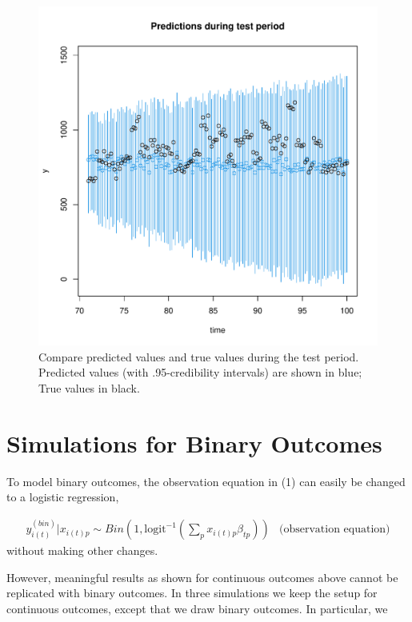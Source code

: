 \documentclass{article}
\begin{document}
\begin{figure}
	\centering
	\includegraphics[width=\textwidth]{compare_predictions_with_simulated_data.pdf}
	\caption{Compare predicted values and true values during the test period. Predicted values (with .95-credibility intervals) are shown in blue; True values in black.}
	\label{fig:fig4}
\end{figure}

\section{Simulations for Binary Outcomes}\label{sec:binary}

To model binary outcomes, the observation equation in (1) can easily be changed to a logistic regression,

\begin{eqnarray}
y^{(bin)}_{i(t)} | x_{i(t)p} \sim Bin(1, \textrm{logit}^{-1}(\sum_p x_{i(t)p} \beta_{tp})) & \textrm{(observation equation)}
\end{eqnarray}
without making other changes.

However, meaningful results as shown for continuous outcomes above cannot be replicated with binary outcomes. In three simulations we keep the setup for continuous outcomes, except that we draw binary outcomes. In particular, we 
\end{document}
